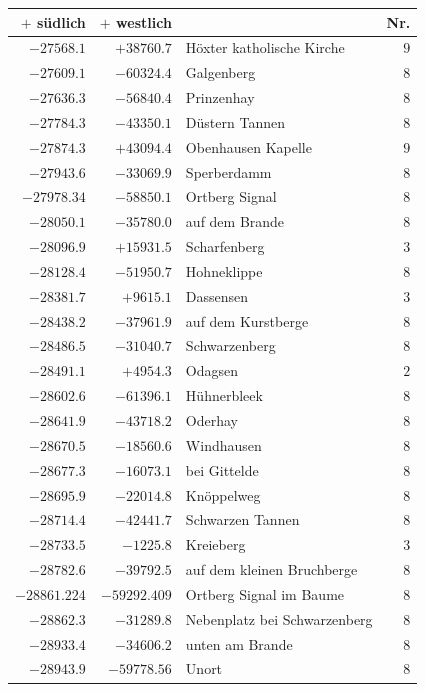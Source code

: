 \clearpage{}%
\begin{center}\begingroup\fontsize{8}{9}\selectfont
\setlength{\tabcolsep}{4pt}
\begin{tabular}{r|r|p{170pt}|r}\hline
\(+\) südlich&\(+\) westlich&&Nr.\\\hline
\(-27568.1\)&\(+38760.7\)&Höxter katholische Kirche&\(9\)\\
\(-27609.1\)&\(-60324.4\)&Galgenberg&\(8\)\\
\(-27636.3\)&\(-56840.4\)&Prinzenhay&\(8\)\\
\(-27784.3\)&\(-43350.1\)&Düstern Tannen&\(8\)\\
\(-27874.3\)&\(+43094.4\)&Obenhausen Kapelle&\(9\)\\
\(-27943.6\)&\(-33069.9\)&Sperberdamm&\(8\)\\
\(-27978.34\)&\(-58850.1\)&Ortberg Signal&\(8\)\\
\(-28050.1\)&\(-35780.0\)&auf dem Brande&\(8\)\\
\(-28096.9\)&\(+15931.5\)&Scharfenberg&\(3\)\\
\(-28128.4\)&\(-51950.7\)&Hohneklippe&\(8\)\\
\(-28381.7\)&\(+9615.1\)&Dassensen&\(3\)\\
\(-28438.2\)&\(-37961.9\)&auf dem Kurstberge&\(8\)\\
\(-28486.5\)&\(-31040.7\)&Schwarzenberg&\(8\)\\
\(-28491.1\)&\(+4954.3\)&Odagsen&\(2\)\\
\(-28602.6\)&\(-61396.1\)&Hühnerbleek&\(8\)\\
\(-28641.9\)&\(-43718.2\)&Oderhay&\(8\)\\
\(-28670.5\)&\(-18560.6\)&Windhausen&\(8\)\\
\(-28677.3\)&\(-16073.1\)&bei Gittelde&\(8\)\\
\(-28695.9\)&\(-22014.8\)&Knöppelweg&\(8\)\\
\(-28714.4\)&\(-42441.7\)&Schwarzen Tannen&\(8\)\\
\(-28733.5\)&\(-1225.8\)&Kreieberg&\(3\)\\
\(-28782.6\)&\(-39792.5\)&auf dem kleinen Bruchberge&\(8\)\\
\(-28861.224\)&\(-59292.409\)&Ortberg Signal im Baume&\(8\)\\
\(-28862.3\)&\(-31289.8\)&Nebenplatz bei Schwarzenberg&\(8\)\\
\(-28933.4\)&\(-34606.2\)&unten am Brande&\(8\)\\
\(-28943.9\)&\(-59778.56\)&Unort&\(8\)\\

\end{tabular}
\end{center}
